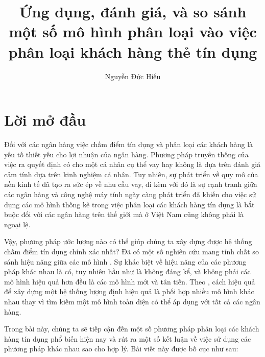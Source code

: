 \documentclass[a4paper]{report}\usepackage[]{graphicx}\usepackage[]{color}
\title{Ứng dụng, đánh giá, và so sánh một số mô hình phân loại vào việc phân loại khách hàng thẻ tín dụng}\let\Title\@title
\author{Nguyễn Đức Hiếu}\let\Author\@author
\begin{document}



\chapter*{Lời mở đầu}

%
Đối với các ngân hàng việc chấm điểm tín dụng và phân loại các khách hàng là yếu tố thiết yếu cho lợi nhuận của ngân hàng.
%
Phương pháp truyền thống của việc ra quyết định có cho một cá nhân cụ thể vay hay không là dựa trên đánh giá cảm tính dựa trên kinh nghiệm cá nhân.
%
Tuy nhiên, sự phát triển về quy mô của nền kinh tế đã tạo ra sức ép về nhu cầu vay, đi kèm với đó là sự cạnh tranh giữa các ngân hàng và công nghệ máy tính ngày càng phát triển đã khiến cho việc sử dụng các mô hình thống kê trong việc phân loại các khách hàng tín dụng là bắt buộc đối với các ngân hàng trên thế giới mà ở Việt Nam cũng không phải là ngoại lệ.
%

Vậy, phương pháp ước lượng nào có thể giúp chúng ta xây dựng được hệ thống chấm điểm tín dụng chính xác nhất? Đã có một số nghiên cứu mang tính chất so sánh hiệu năng giữa các mô hình \citep{baesens2003benchmarking, xiao2006comparative, lessmann2015benchmarking}. 
Sự khác biệt về hiệu năng của các phương pháp khác nhau là có, tuy nhiên hầu như là không đáng kể, và không phải các mô hình hiệu quả hơn đều là các mô hình mới và tân tiến.
Theo \citet{thomas2010consumer}, cách hiệu quả để xây dựng một hệ thống lượng định hiệu quả là phối hợp nhiều mô hình khác nhau thay vì tìm kiếm một mô hình toàn diện có thể áp dụng với tất cả các ngân hàng.

Trong bài này, chúng ta sẽ tiếp cận đến một số phương pháp phân loại các khách hàng tín dụng phổ biến hiện nay và rút ra một số kết luận về việc sử dụng các phương pháp khác nhau sao cho hợp lý. Bài viết này được bố cục như sau:
\end{document}
